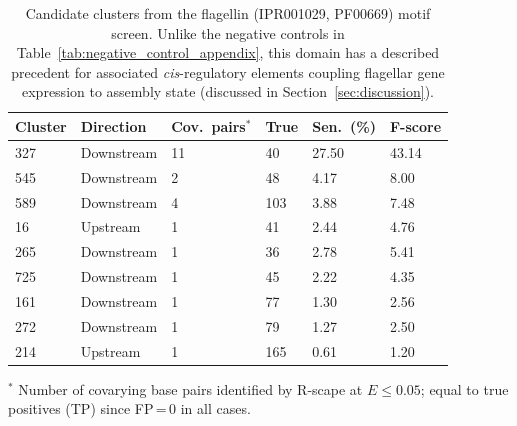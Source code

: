 \begin{table}[H]
\centering
\footnotesize
\caption{Candidate clusters from the flagellin (IPR001029, PF00669) motif screen. Unlike the negative controls in Table~\ref{tab:negative_control_appendix}, this domain has a described precedent for associated \emph{cis}-regulatory elements coupling flagellar gene expression to assembly state (discussed in Section~\ref{sec:discussion}).}
\label{tab:flagellin_appendix}
\begin{tabular}{p{}p{}p{}p{}p{}p{}}
\hline
\textbf{Cluster} & \textbf{Direction} & \textbf{Cov.\ pairs$^{*}$} & \textbf{True} & \textbf{Sen.\ (\%)} & \textbf{F-score} \\
\hline
327 & Downstream & 11 & 40  & 27.50 & 43.14 \\
545 & Downstream & 2  & 48  & 4.17  & 8.00 \\
589 & Downstream & 4  & 103 & 3.88  & 7.48 \\
16  & Upstream   & 1  & 41  & 2.44  & 4.76 \\
265 & Downstream & 1  & 36  & 2.78  & 5.41 \\
725 & Downstream & 1  & 45  & 2.22  & 4.35 \\
161 & Downstream & 1  & 77  & 1.30  & 2.56 \\
272 & Downstream & 1  & 79  & 1.27  & 2.50 \\
214 & Upstream   & 1  & 165 & 0.61  & 1.20 \\
\hline
\end{tabular}

\par\smallskip
\begin{minipage}{\textwidth}
\raggedright
$^{*}$ Number of covarying base pairs identified by R-scape at $E \le 0.05$; equal to true positives (TP) since FP\,=\,0 in all cases.
\end{minipage}
\end{table}